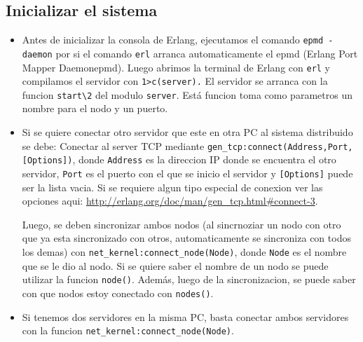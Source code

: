 \documentclass[a4paper]{article}
\newcommand{\blacktr}[0]{\item[$\blacktriangleright$]}
\begin{document}
\subsection*{Inicializar el sistema}
\begin{itemize}
    \blacktr Antes de inicializar la consola de Erlang, ejecutamos el comando \texttt{\textdollar epmd -daemon} por si el comando \texttt{\textdollar erl} arranca automaticamente el epmd (Erlang  Port  Mapper  Daemonepmd). Luego abrimos la terminal de Erlang con \texttt{\textdollar erl} y compilamos el servidor con \texttt{1\textgreater c(server).} El servidor se arranca con la funcion \texttt{start\textbackslash2} del modulo \texttt{server}. Está funcion toma como parametros un nombre para el nodo y un puerto. 

    \blacktr Si se quiere conectar otro servidor que este en otra PC al sistema distribuido se debe:
      Conectar al server TCP mediante \texttt{gen_tcp:connect(Address,Port,[Options])}, donde \texttt{Address} es la direccion IP donde se encuentra el otro servidor, \texttt{Port} es el puerto con el que se inicio el servidor y \texttt{[Options]} puede ser la lista vacia. Si se requiere algun tipo especial de conexion ver las opciones aqui: \url{http://erlang.org/doc/man/gen_tcp.html#connect-3}.

      Luego, se deben sincronizar ambos nodos (al sincrnoziar un nodo con otro que ya esta sincronizado con otros, automaticamente se sincroniza con todos los demas) con \texttt{net_kernel:connect_node(Node)}, donde \texttt{Node} es el nombre que se le dio al nodo. Si se quiere saber el nombre de un nodo se puede utilizar la funcion \texttt{node()}. Además, luego de la sincronizacion, se puede saber con que nodos estoy conectado con \texttt{nodes()}.

    \blacktr Si tenemos dos servidores en la misma PC, basta conectar ambos servidores con la funcion \texttt{net_kernel:connect_node(Node)}.
\end{itemize}
\end{document}
